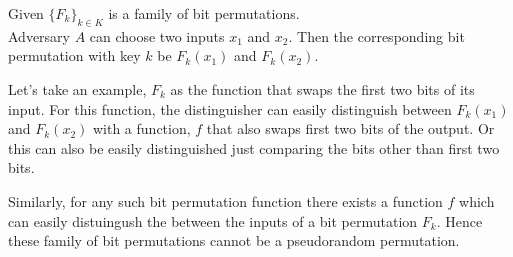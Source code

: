 Given $ \{F_k\}_{k \in K} $ is a family of bit permutations.\\

Adversary $A$ can choose two inputs $x_1$ and $x_2$. Then the corresponding bit permutation with key $k$ be
$F_{k}(x_1)$ and $F_{k}(x_2)$.

Let's take an example, $F_k$ as the function that swaps the first two bits of its input.
For this function, the distinguisher can easily distinguish between $F_{k}(x_1)$ and $F_{k}(x_2)$
with a function, $f$ that also swaps first two bits of the output. Or this can also be easily 
distinguished just comparing the bits other than first two bits.

Similarly, for any such bit permutation function there exists a function $f$ which can easily distuingush the between the inputs
of a bit permutation $F_k$. Hence these family of bit permutations cannot be a pseudorandom permutation.

